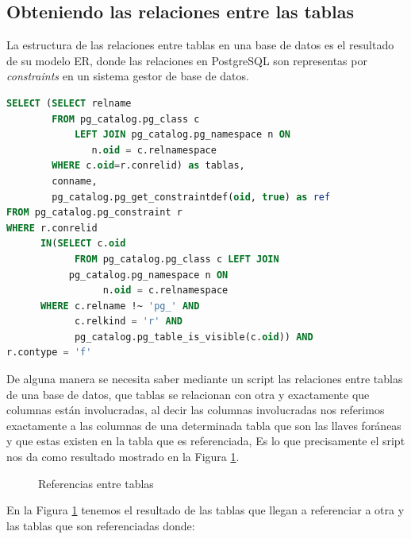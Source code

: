\subsection{Obteniendo las relaciones entre las tablas}
La estructura de las relaciones entre tablas en una base de datos es el resultado de su modelo ER, donde las relaciones en PostgreSQL son representas por \textit{constraints} en un sistema gestor de base de datos.
\begin{lstlisting}[caption={Query para obtener el detalle de referencias},label={SQL Tablas que referencian},language=sql]
SELECT (SELECT relname
        FROM pg_catalog.pg_class c
        	LEFT JOIN pg_catalog.pg_namespace n ON
		       n.oid = c.relnamespace
        WHERE c.oid=r.conrelid) as tablas,
        conname,
        pg_catalog.pg_get_constraintdef(oid, true) as ref 
FROM pg_catalog.pg_constraint r 
WHERE r.conrelid 
	  IN(SELECT c.oid 
		    FROM pg_catalog.pg_class c LEFT JOIN
           pg_catalog.pg_namespace n ON 
		         n.oid = c.relnamespace 
      WHERE c.relname !~ 'pg_' AND 
            c.relkind = 'r' AND 
            pg_catalog.pg_table_is_visible(c.oid)) AND 
r.contype = 'f'
\end{lstlisting}
De alguna manera se necesita saber mediante un script las relaciones entre tablas de una base de datos, que tablas se relacionan con otra y exactamente que columnas est\'an involucradas, al decir las columnas involucradas nos referimos exactamente a las columnas de una determinada tabla que son las llaves for\'aneas y que estas existen en la tabla que es referenciada, Es lo que precisamente el sript nos da como resultado mostrado en la Figura \ref{fig:Referencias entre tablas}.
\begin{figure}[H]
\centering
{}
\caption{Referencias entre tablas} \label{fig:Referencias entre tablas}
\end{figure}
En la Figura \ref{fig:Referencias entre tablas} tenemos el resultado de las tablas que llegan a referenciar a otra y las tablas que son referenciadas donde:

